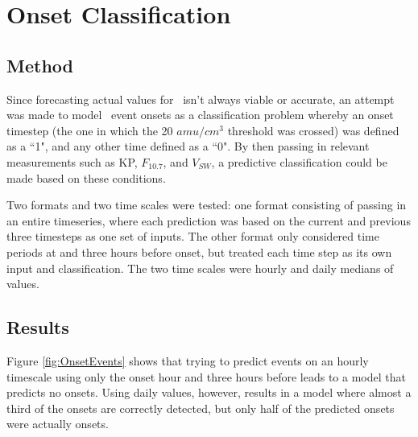 \chapter[Onset Classification]{Onset Classification}

\section{Method}
Since forecasting actual values for \req\ isn't always viable or accurate, an attempt was made to model \req\ event onsets as a classification problem whereby an onset timestep (the one in which the 20 $amu/cm^3$ threshold was crossed) was defined as a ``1", and any other time defined as a ``0". By then passing in relevant measurements such as KP, $F_{10.7}$, and $V_{SW}$, a predictive classification could be made based on these conditions.

Two formats and two time scales were tested: one format consisting of passing in an entire timeseries, where each prediction was based on the current and previous three timesteps as one set of inputs. The other format only considered time periods at and three hours before onset, but treated each time step as its own input and classification. The two time scales were hourly and daily medians of values.


\section{Results}

Figure \ref{fig:OnsetEvents} shows that trying to predict events on an hourly timescale using only the onset hour and three hours before leads to a model that predicts no onsets. Using daily values, however, results in a model where almost a third of the onsets are correctly detected, but only half of the predicted onsets were actually onsets.


